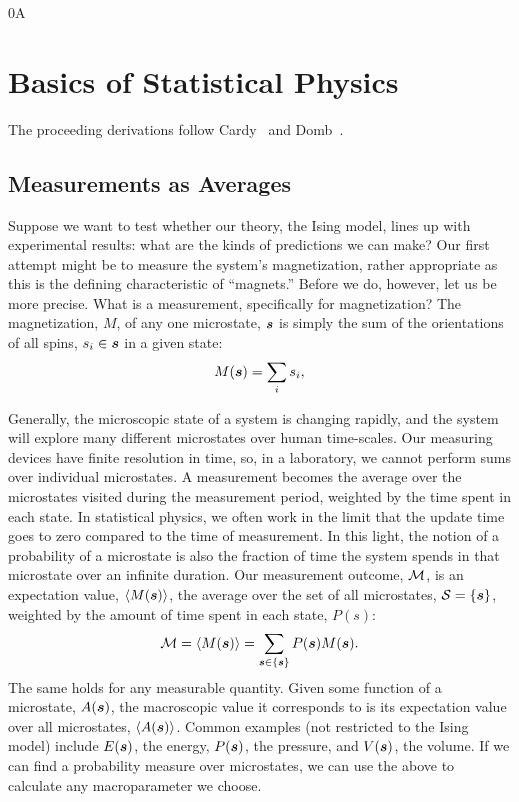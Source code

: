 0A\appendix
\chapter{Basics of Statistical Physics}
The proceeding derivations follow Cardy~\cite{cardy} and Domb~\cite{domb}.
\section{Measurements as Averages}\label{sec:measurements-as-averages}
Suppose we want to test whether our theory, the Ising model, lines up
with experimental results: what are the kinds of predictions we can
make? Our first attempt might be to measure the system's
magnetization, rather appropriate as this is the defining
characteristic of ``magnets.'' Before we do, however, let us be more
precise. What is a measurement, specifically for magnetization? The
magnetization, $M$, of any one microstate, $\boldsymbol{s}$ is simply the sum of
the orientations of all spins, $s_i\in\boldsymbol{s}$ in a given state:%
\begin{equation}%
  M(\bs)=\sum_{i} s_i,
  \label{eq:magnetization}
\end{equation}%

Generally, the microscopic state of a system is changing rapidly, and
the system will explore many different microstates over human
time-scales. Our measuring devices have finite resolution in time, so,
in a laboratory, we cannot perform sums over individual microstates. A
measurement becomes the average over the microstates visited during
the measurement period, weighted by the time spent in each state. In
statistical physics, we often work in the limit that the update time
goes to zero compared to the time of measurement. In this light, the
notion of a probability of a microstate is also the fraction of time
the system spends in that microstate over an infinite duration. Our
measurement outcome, $\mathcal{M}$, is an expectation value,
$\langle{}{M(\boldsymbol{s})}\rangle{}$, the average over the set of all microstates,
$\mathcal{S}=\{\boldsymbol{s}\}$, weighted by the amount of time spent in each state,
$P(s)$:%
\begin{equation}%
  \mc{M}=\expect{M(\bs)}=\sum_{\bs\in\{\bs\}}P(\bs)M(\bs).
  \label{eq:magnetization-expectation}
\end{equation}%
The same holds for any measurable quantity. Given some function of a
microstate, $A(\boldsymbol{s})$, the macroscopic value it corresponds to is its
expectation value over all microstates, $\langle{}{A(\boldsymbol{s})}\rangle{}$. Common
examples (not restricted to the Ising model) include $E(\boldsymbol{s})$, the
energy, $P(\boldsymbol{s})$, the pressure, and $V(\boldsymbol{s})$, the volume. If we can
find a probability measure over microstates, we can use the above to
calculate any macroparameter we choose.

